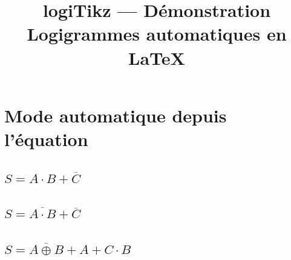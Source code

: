 \documentclass[a4paper,11pt]{article}
\title{\textbf{logiTikz} --- D\'emonstration\\[4pt]
       \large Logigrammes automatiques en \LaTeX}
\begin{document}
\maketitle

\section{Mode automatique depuis l'\'equation}

\subsection*{\boldmath$S = A \cdot B + \overline{C}$}
\subsection*{\boldmath$S = \overline{A \cdot B} + \overline{C}$}
\subsection*{\boldmath$S = \overline{A \oplus B}+A+C \cdot B$}
\end{document}
